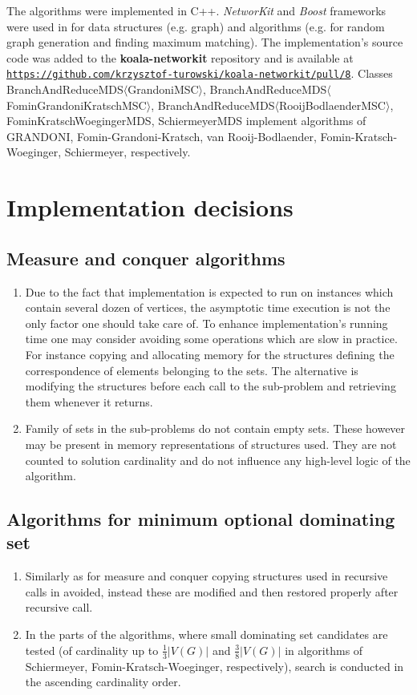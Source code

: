 The algorithms were implemented in C++. \textit{NetworKit} and \textit{Boost} frameworks were used in for data structures (e.g. graph) and algorithms (e.g. for random graph generation and finding maximum matching). The implementation's source code was added to the \textbf{koala-networkit} repository and is available at \href{https://github.com/krzysztof-turowski/koala-networkit/pull/8}{\texttt{https://github.com/krzysztof-turowski/koala-networkit/pull/8}}. Classes BranchAndReduceMDS$\langle$GrandoniMSC$\rangle$, BranchAndReduceMDS$\langle$FominGrandoniKratschMSC$\rangle$, BranchAndReduceMDS$\langle$RooijBodlaenderMSC$\rangle$, FominKratschWoegingerMDS, SchiermeyerMDS implement algorithms of GRANDONI, Fomin-Grandoni-Kratsch, van Rooij-Bodlaender, Fomin-Kratsch-Woeginger, Schiermeyer, respectively.
\section{Implementation decisions}
\subsection{Measure and conquer algorithms}
\begin{enumerate}
    \item Due to the fact that implementation is expected to run on instances which contain several dozen of vertices, the asymptotic time execution is not the only factor one should take care of. To enhance implementation's running time one may consider avoiding some operations which are slow in practice. For instance copying and allocating memory for the structures defining the correspondence of elements belonging to the sets. The alternative is modifying the structures before each call to the sub-problem and retrieving them whenever it returns.
    \item Family of sets in the sub-problems do not contain empty sets. These however may be present in memory representations of structures used. They are not counted to solution cardinality and do not influence any high-level logic of the algorithm. 
\end{enumerate}
\subsection{Algorithms for minimum optional dominating set}
\begin{enumerate}
    \item Similarly as for measure and conquer copying structures used in recursive calls in avoided, instead these are modified and then restored properly after recursive call.
    \item In the parts of the algorithms, where small dominating set candidates are tested (of cardinality up to $\frac{1}{3}|V(G)|$ and $\frac{3}{8}|V(G)|$ in algorithms of Schiermeyer, Fomin-Kratsch-Woeginger, respectively), search is conducted in the ascending cardinality order.
\end{enumerate}

